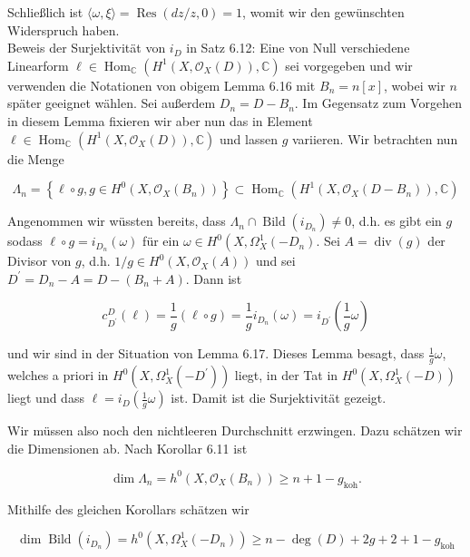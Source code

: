 \documentclass[10pt, letterpaper]{article}
\begin{document}
Schließlich ist $\langle\omega, \xi\rangle=\operatorname{Res}(d z / z, 0)=1$, womit wir den gewünschten Widerspruch haben.\\
Beweis der Surjektivität von $i_{D}$ in Satz 6.12: Eine von Null verschiedene Linearform $\ell \in \operatorname{Hom}_{\mathbb{C}}\left(H^{1}\left(X, \mathcal{O}_{X}(D)\right), \mathbb{C}\right)$ sei vorgegeben und wir verwenden die Notationen von obigem Lemma 6.16 mit $B_{n}=n[x]$, wobei wir $n$ später geeignet wählen. Sei außerdem $D_{n}=D-B_{n}$. Im Gegensatz zum Vorgehen in diesem Lemma fixieren wir aber nun das in Element $\ell \in \operatorname{Hom}_{\mathbb{C}}\left(H^{1}\left(X, \mathcal{O}_{X}(D)\right), \mathbb{C}\right)$ und lassen $g$ variieren. Wir betrachten nun die Menge

$$
\Lambda_{n}=\left\{\ell \circ g, g \in H^{0}\left(X, \mathcal{O}_{X}\left(B_{n}\right)\right)\right\} \subset \operatorname{Hom}_{\mathbb{C}}\left(H^{1}\left(X, \mathcal{O}_{X}\left(D-B_{n}\right)\right), \mathbb{C}\right)
$$

Angenommen wir wüssten bereits, dass $\Lambda_{n} \cap \operatorname{Bild}\left(i_{D_{n}}\right) \neq 0$, d.h. es gibt ein $g$ sodass $\ell \circ g=i_{D_{n}}(\omega)$ für ein $\omega \in H^{0}\left(X, \Omega_{X}^{1}\left(-D_{n}\right)\right.$. Sei $A=\operatorname{div}(g)$ der Divisor von $g$, d.h. $1 / g \in H^{0}\left(X, \mathcal{O}_{X}(A)\right)$ und sei $D^{\prime}=D_{n}-A=D-\left(B_{n}+A\right)$. Dann ist

$$
c_{D^{\prime}}^{D}(\ell)=\frac{1}{g}(\ell \circ g)=\frac{1}{g} i_{D_{n}}(\omega)=i_{D^{\prime}}\left(\frac{1}{g} \omega\right)
$$

und wir sind in der Situation von Lemma 6.17. Dieses Lemma besagt, dass $\frac{1}{g} \omega$, welches a priori in $H^{0}\left(X, \Omega_{X}^{1}\left(-D^{\prime}\right)\right)$ liegt, in der Tat in $H^{0}\left(X, \Omega_{X}^{1}(-D)\right)$ liegt und dass $\ell=i_{D}\left(\frac{1}{g} \omega\right)$ ist. Damit ist die Surjektivität gezeigt.

Wir müssen also noch den nichtleeren Durchschnitt erzwingen. Dazu schätzen wir die Dimensionen ab. Nach Korollar 6.11 ist

$$
\operatorname{dim} \Lambda_{n}=h^{0}\left(X, \mathcal{O}_{X}\left(B_{n}\right)\right) \geq n+1-g_{\mathrm{koh}} .
$$

Mithilfe des gleichen Korollars schätzen wir

$$
\operatorname{dim} \operatorname{Bild}\left(i_{D_{n}}\right)=h^{0}\left(X, \Omega_{X}^{1}\left(-D_{n}\right)\right) \geq n-\operatorname{deg}(D)+2 g+2+1-g_{\mathrm{koh}}
$$
\end{document}
